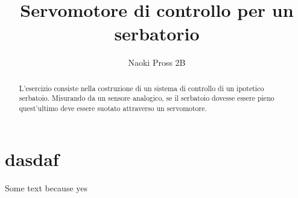 \documentclass[a4paper]{article}        %
\begin{document}
	\author{Naoki Pross 2B}
    \title{Servomotore di controllo per un serbatorio} 
	\maketitle

    \begin{abstract}
        L'esercizio consiste nella costruzione di un sistema di controllo di un
        ipotetico serbatoio. Misurando da un sensore analogico, se il serbatoio
        dovesse essere pieno quest'ultimo deve essere suotato attraverso un
        servomotore.
    \end{abstract}
	
	\section{dasdaf}
        Some text because yes
    
\end{document}
